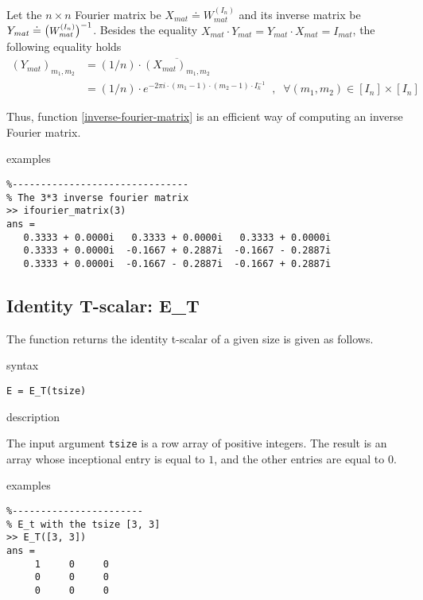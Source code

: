 \documentclass[12pt,reqno]{amsart}
\numberwithin{equation}{section}
\numberwithin{figure}{section}
\numberwithin{table}{section}
\theoremstyle{definition}
\begin{document}
Let the $n\times n$ Fourier matrix be $X_\mathit{mat} \doteq W_\mathit{mat}^{(I_n)}$ and its inverse matrix be $Y_\mathit{mat} \doteq \big(   
\scalebox{0.9}{$W_\mathit{mat}^{(I_n)}$}
 \big)^{-1}$. Besides the equality $X_\mathit{mat} \cdot Y_\mathit{mat} = Y_\mathit{mat} \cdot X_\mathit{mat} = I_\mathit{mat} $, the following equality holds 
\begin{equation} 
\begin{aligned}
(Y_\mathit{mat})_{m_1, m_2} &= (1/n) \cdot \overline{(X_\mathit{mat})_{m_1, m_2}}  \\
&= (1/n) \cdot e^{-2\pi i
\cdot (m_1 - 1) \cdot (m_2 - 1) \cdot I_{k}^{-1}  }  
\;\;,\;\; \forall (m_1, m_2) \in [I_n] \times [I_n]
\end{aligned}
\end{equation}

Thus, {\sc function} \ref{inverse-fourier-matrix} is an efficient way of computing an inverse Fourier matrix.  


\noindent
{\color{red} \sc examples}
\begin{verbatim}
%-------------------------------   
% The 3*3 inverse fourier matrix  
>> ifourier_matrix(3)
ans = 
   0.3333 + 0.0000i   0.3333 + 0.0000i   0.3333 + 0.0000i
   0.3333 + 0.0000i  -0.1667 + 0.2887i  -0.1667 - 0.2887i
   0.3333 + 0.0000i  -0.1667 - 0.2887i  -0.1667 + 0.2887i
\end{verbatim}


\subsection{{\color{blue} \sc Identity T-scalar}: {\color{blue}E\_T}} 
The function returns the identity t-scalar of a given size is given as follows. 

\noindent 
{\color{red} \sc syntax}

{\tt  E = E\_T(tsize) }


\noindent
{\color{red} \sc description}

The input argument {\tt tsize} is a row array of positive integers. The result is an array whose inceptional entry is equal to $1$, and the other entries are equal to $0$.  


\noindent
{\color{red} \sc examples}
\begin{verbatim}
%-----------------------   
% E_t with the tsize [3, 3]
>> E_T([3, 3])
ans =
     1     0     0
     0     0     0
     0     0     0
\end{verbatim}
\end{document}
